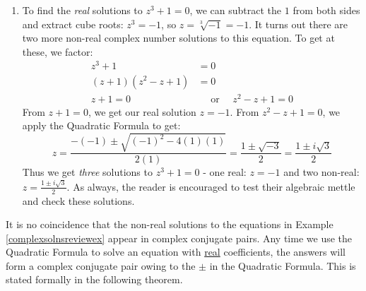 {\begin{enumerate}
\item To find  the \textit{real} solutions to  $z^3 + 1 = 0$, we can subtract the $1$ from both sides and extract cube roots: $z^3 = -1$, so $z  = \sqrt[3]{-1} = -1$.  It turns out there are two more non-real complex number solutions to this equation.  To get at these, we factor:
\begin{align*}
z ^ 3 + 1 & =  0  \\
(z + 1)(z^2 - z + 1) & =  0  \tag*{Factor (Sum of Two Cubes)} \\
z + 1 = 0 & \quad \text{ or } \quad  z^2 - z + 1 = 0
\end{align*}
From $z+1 = 0$, we get our real solution $z = -1$.  From $z^2 -z + 1 = 0$, we apply the Quadratic Formula to get: 
\[
z = \dfrac{-(-1) \pm \sqrt{(-1)^2 - 4(1)(1)}}{2(1)} = \dfrac{1 \pm \sqrt{-3}}{2} = \dfrac{1 \pm i\sqrt{3}}{2}
\]
Thus we get \textit{three} solutions to $z^3 + 1 = 0$ - one real: $z = -1$ and two non-real: $z =  \frac{1 \pm i\sqrt{3}}{2}$.  As always, the reader is encouraged to test their algebraic mettle and check these solutions. 
		
\end{enumerate}
}

\medskip

It is no coincidence that the non-real solutions to the equations in Example \ref{complexsolnsreviewex} appear in  complex conjugate pairs. Any time we use the Quadratic Formula to solve an equation with \underline{real} coefficients, the answers will form a  complex conjugate pair owing to the $\pm$ in the Quadratic Formula.  This is stated formally in the following theorem.

\smallskip


